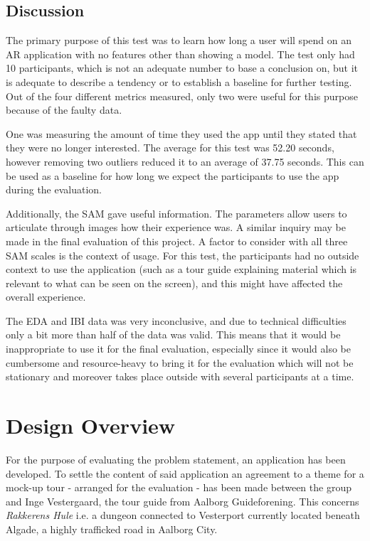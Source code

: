 \subsection{Discussion}
The primary purpose of this test was to learn how long a user will spend on an AR application with no features other than showing a model. The test only had 10 participants, which is not an adequate number to base a conclusion on, but it is adequate to describe a tendency or to establish a baseline for further testing. Out of the four different metrics measured, only two were useful for this purpose because of the faulty data. 

One was measuring the amount of time they used the app until they stated that they were no longer interested. The average for this test was 52.20 seconds, however removing two outliers reduced it to an average of 37.75 seconds. This can be used as a baseline for how long we expect the participants to use the app during the evaluation.

Additionally, the SAM gave useful information. The parameters allow users to articulate through images how their experience was. A similar inquiry may be made in the final evaluation of this project. A factor to consider with all three SAM scales is the context of usage. For this test, the participants had no outside context to use the application (such as a tour guide explaining material which is relevant to what can be seen on the screen), and this might have affected the overall experience.

The EDA and IBI data was very inconclusive, and due to technical difficulties only a bit more than half of the data was valid. This means that it would be inappropriate to use it for the final evaluation, especially since it would also be cumbersome and resource-heavy to bring it for the evaluation which will not be stationary and moreover takes place outside with several participants at a time.\pagebreak

\section{Design Overview}\label{sec:design}
For the purpose of evaluating the problem statement, an application has been developed. To settle the content of said application an agreement to a theme for a mock-up tour - arranged for the evaluation - has been made between the group and Inge Vestergaard, the tour guide from Aalborg Guideforening. This concerns \textit{Rakkerens Hule} i.e. a dungeon connected to Vesterport currently located beneath Algade, a highly trafficked road in Aalborg City. 

